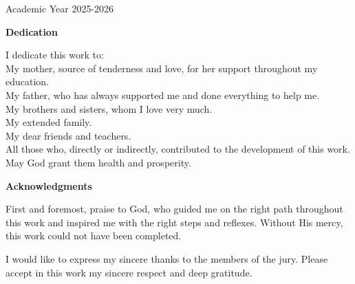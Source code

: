 \documentclass[a4paper,12pt]{report}
\begin{document}
\begin{titlepage}
\begin{center}
\begin{minipage}{0.58\textwidth}
\begin{flushleft}
\end{flushleft}
\end{minipage}

\vspace{1.5cm}

\vfill

\vspace{1cm}
{\large Academic Year 2025-2026}

\end{center}
\end{titlepage}

\begin{doublespace}
\newpage
{}
{}

\vspace*{1cm}
\begin{center}
    \textbf{\huge{Dedication}}
\end{center}
\vspace{1cm}

\large{
I dedicate this work to:\\
My mother, source of tenderness and love, for her support throughout my education.\\
My father, who has always supported me and done everything to help me.\\
My brothers and sisters, whom I love very much.\\
My extended family.\\
My dear friends and teachers.\\
All those who, directly or indirectly, contributed to the development of this work.\\
May God grant them health and prosperity.}

\newpage
{}
{}

\vspace*{1cm}
\begin{center}
    \textbf{\huge{Acknowledgments}}
\end{center}

\vspace{1cm}
\large{
First and foremost, praise to God, who guided me on the right path throughout this work and inspired me with the right steps and reflexes. Without His mercy, this work could not have been completed.

I would like to express my sincere thanks to the members of the jury. Please accept in this work my sincere respect and deep gratitude.

}
\end{doublespace}
\end{document}
